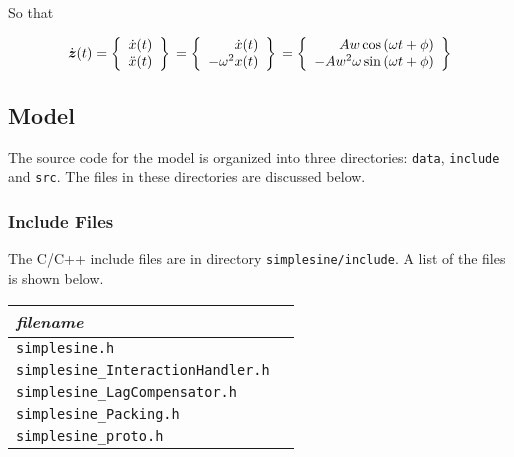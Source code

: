 So that

\begin{equation}
\label{eq:derivative-equations}
  \dot{\boldsymbol{z}}(t)
  = \left\{
            \begin{array}{c}
              \dot{x}(t)\\ \ddot{x}(t)
            \end{array}
     \right\} \\
  = \left\{
            \begin{array}{r}
              \dot{x}(t)\\ - \omega^2 x(t)
            \end{array}
     \right\} \\
  = \left\{
            \begin{array}{r}
                    A w \cos{(\omega t + \phi)} \\
                    - A w^2 \omega \sin{(\omega t + \phi)}
            \end{array}
     \right\}
\end{equation}

\subsection{Model}

The source code for the \simplesine model is organized into three directories:
{\tt data}, {\tt include} and {\tt src}.
The files in these directories are discussed below.

\subsubsection{Include Files}

The \simplesine C/C++ include files are in directory {\tt simplesine/include}.
A list of the files is shown below.

{
\begin{center}
\scriptsize
\begin{tabular}{|l|l|}
\hline
{\em filename} \\
\hline
\hline
{\tt simplesine.h} \\
\hline
{\tt simplesine\_InteractionHandler.h} \\
\hline
{\tt simplesine\_LagCompensator.h} \\
\hline
{\tt simplesine\_Packing.h} \\
\hline
{\tt simplesine\_proto.h} \\
\hline
\end{tabular}
\end{center}
}

